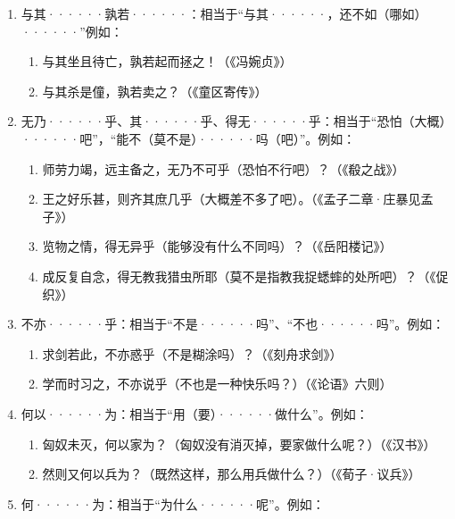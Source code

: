 \begin{enumerate}
\begin{enumerate}[label=\textcircled{\arabic*}]
		\item 我孰与城北徐公美？（我同城北徐公比谁美呢？）（《邹忌讽齐王纳谏》）
		\item 为两郎僮，孰若为一郎僮耶？（做两个人的僮仆，哪如做一个人的僮仆呢？）（《童区寄传》）
	\end{enumerate}
	\item 与其······孰若······：相当于“与其······，还不如（哪如）······”例如：
	\begin{enumerate}[label=\textcircled{\arabic*}]
		\item 与其坐且待亡，孰若起而拯之！（《冯婉贞》）
		\item 与其杀是僮，孰若卖之？（《童区寄传》）
	\end{enumerate}
	\item 无乃······乎、其······乎、得无······乎：相当于“恐怕（大概）······吧”，“能不（莫不是）······吗（吧）”。例如：
	\begin{enumerate}[label=\textcircled{\arabic*}]
		\item 师劳力竭，远主备之，无乃不可乎（恐怕不行吧）？（《殽之战》）
		\item 王之好乐甚，则齐其庶几乎（大概差不多了吧）。（《孟子二章·庄暴见孟子》）
		\item 览物之情，得无异乎（能够没有什么不同吗）？（《岳阳楼记》）
		\item 成反复自念，得无教我猎虫所耶（莫不是指教我捉蟋蟀的处所吧）？（《促织》）
	\end{enumerate}
	\item 不亦······乎：相当于“不是······吗”、“不也······吗”。例如：
	\begin{enumerate}[label=\textcircled{\arabic*}]
		\item 求剑若此，不亦惑乎（不是糊涂吗）？（《刻舟求剑》）
		\item 学而时习之，不亦说乎（不也是一种快乐吗？）（《论语》六则）
	\end{enumerate}
	\item 何以······为：相当于“用（要）······做什么”。例如：
	\begin{enumerate}[label=\textcircled{\arabic*}]
		\item 匈奴未灭，何以家为？（匈奴没有消灭掉，要家做什么呢？）（《汉书》）
		\item 然则又何以兵为？（既然这样，那么用兵做什么？）（《荀子·议兵》）
	\end{enumerate}
	\item 何······为：相当于“为什么······呢”。例如：
	\begin{enumerate}[label=\textcircled{\arabic*}]

\end{enumerate}
\end{enumerate}
